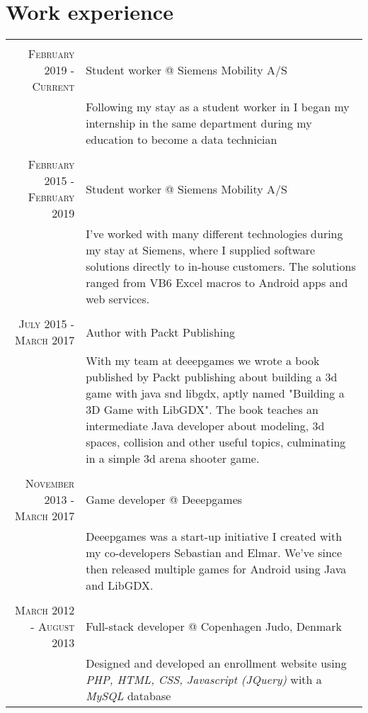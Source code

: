 \documentclass[a4paper,10pt]{article}
\begin{document}
\section{Work experience}
\begin{tabular}{r|p{11cm}}
    \multicolumn{2}{c}{} \\
    \textsc{February 2019 - Current} & Student worker @ Siemens Mobility A/S\\&\footnotesize{Following my stay as a student worker in I began my internship in the same department during my education to become a data technician}\\
    
    \multicolumn{2}{c}{} \\
    \textsc{February 2015 - February 2019} & Student worker @ Siemens Mobility A/S\\&\footnotesize{I’ve worked with many different technologies during my stay at Siemens, where I supplied software solutions directly to in-house customers. The solutions ranged from VB6 Excel macros to Android apps and web services.}\\
    
    \multicolumn{2}{c}{} \\
    \textsc{July 2015 - March 2017} & Author with Packt Publishing\\&\footnotesize{With my team at deeepgames we wrote a book published by Packt publishing about building a 3d game with java snd libgdx, aptly named "Building a 3D Game with LibGDX". The book teaches an intermediate Java developer about modeling, 3d spaces, collision and other useful topics, culminating in a simple 3d arena shooter game.}\\

    \multicolumn{2}{c}{} \\
    \textsc{November 2013 - March 2017} & Game developer @ Deeepgames\\&\footnotesize{Deeepgames was a start-up initiative I created with my co-developers Sebastian and Elmar. We've since then released multiple games for Android using Java and LibGDX.}\\

    \multicolumn{2}{c}{} \\
    \textsc{March 2012 - August 2013} & Full-stack developer @ Copenhagen Judo, Denmark \\&\footnotesize{Designed and developed an enrollment website using \textit{PHP, HTML, CSS, Javascript (JQuery)} with a \textit{MySQL} database}\\
    
\end{tabular}
\end{document}
